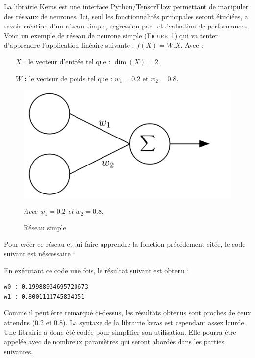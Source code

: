 La librairie Keras est une interface Python/TensorFlow\cite{tf} permettant de manipuler des réseaux de neurones.
Ici, seul les fonctionnalités principales seront étudiées,
a savoir
création d'un réseau simple,
regression par \sgd\
et évaluation de performances.\\


Voici un exemple de réseau de neurone simple (\textsc{Figure}\ \ref{fig:net2})
qui va tenter d'apprendre l'application linéaire suivante : $f(X) = W.X$.
Avec :
\begin{itemize}
    \item[\textbf{$X$ :}] le vecteur d'entrée tel que : $\dim(X) = 2$.
    \item[\textbf{$W$ :}] le vecteur de poids tel que : $w_1 = 0.2$ et $w_2 = 0.8$.
\end{itemize}
\begin{figure}[H]
    \center
    \includegraphics[height=\petit]{pict/net2.png}
	\caption{Réseau simple}
    \vspace{-10pt}
    \begin{center}
        \tiny
        \textit{
        Avec $w_1 = 0.2$ et $w_2 = 0.8$.
        }
    \end{center}
	\label{fig:net2}
\end{figure}
\vspace{-12pt}


Pour créer ce réseau et lui faire apprendre la fonction précédement citée,
le code suivant est néscessaire :



En exécutant ce code une fois, le résultat suivant est obtenu :
\begin{lstlisting}
w0 : 0.19988934695720673
w1 : 0.8001111745834351
\end{lstlisting}

Comme il peut être remarqué ci-dessus, les résultats obtenus sont proches de ceux attendus ($0.2$ et $0.8$).
La syntaxe de la librairie keras est cependant assez lourde.
Une librairie a donc été codée pour simplifier son utilisation.
Elle pourra être appelée avec de nombreux paramètres qui seront abordés dans les parties suivantes.\\


